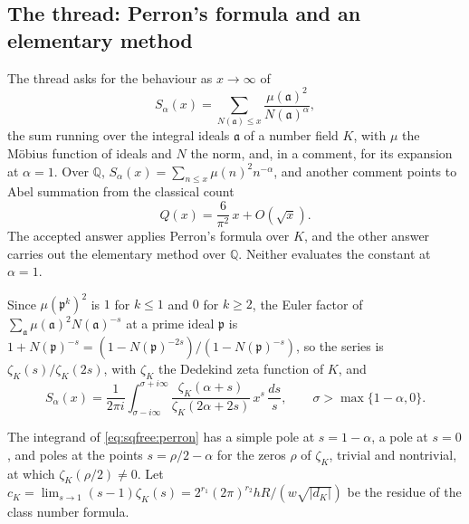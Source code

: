 \subsection{The thread: Perron's formula and an elementary method}\label{sec:sqfree:thread}

The thread asks for the behaviour as $x\to\infty$ of
\[
S_\alpha(x)=\sum_{N(\mathfrak a)\le x}\frac{\mu(\mathfrak a)^2}{N(\mathfrak a)^\alpha},
\]
the sum running over the integral ideals $\mathfrak a$ of a number field $K$, with $\mu$ the M\"obius function of ideals and $N$ the norm, and, in a comment, for its expansion at $\alpha=1$. Over $\mathbb Q$, $S_\alpha(x)=\sum_{n\le x}\mu(n)^2n^{-\alpha}$, and another comment points to Abel summation from the classical count
\begin{equation}\label{eq:sqfree:Q}
Q(x)=\frac6{\pi^2}\,x+O(\sqrt x).
\end{equation}
The accepted answer applies Perron's formula over $K$, and the other answer carries out the elementary method over $\mathbb Q$. Neither evaluates the constant at $\alpha=1$.

Since $\mu(\mathfrak p^k)^2$ is $1$ for $k\le1$ and $0$ for $k\ge2$, the Euler factor of $\sum_{\mathfrak a}\mu(\mathfrak a)^2N(\mathfrak a)^{-s}$ at a prime ideal $\mathfrak p$ is $1+N(\mathfrak p)^{-s}=(1-N(\mathfrak p)^{-2s})/(1-N(\mathfrak p)^{-s})$, so the series is $\zeta_K(s)/\zeta_K(2s)$, with $\zeta_K$ the Dedekind zeta function of $K$, and
\begin{equation}\label{eq:sqfree:perron}
S_\alpha(x)=\frac1{2\pi i}\int_{\sigma-i\infty}^{\sigma+i\infty}\frac{\zeta_K(\alpha+s)}{\zeta_K(2\alpha+2s)}\,x^s\,\frac{ds}s,\qquad \sigma>\max\{1-\alpha,0\}.
\end{equation}

The integrand of \eqref{eq:sqfree:perron} has a simple pole at $s=1-\alpha$, a pole at $s=0$, and poles at the points $s=\rho/2-\alpha$ for the zeros $\rho$ of $\zeta_K$, trivial and nontrivial, at which $\zeta_K(\rho/2)\ne0$. Let $c_K=\lim_{s\to1}(s-1)\zeta_K(s)=2^{r_1}(2\pi)^{r_2}hR/(w\sqrt{|d_K|})$ be the residue of the class number formula.


